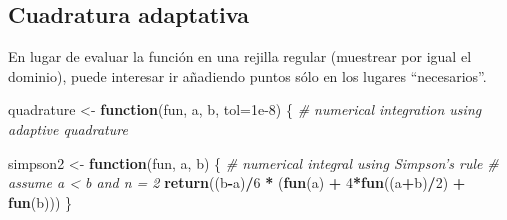 \documentclass[
]{book}
\newenvironment{Shaded}{\begin{snugshade}}{\end{snugshade}}
\newcommand{\CommentTok}[1]{\textcolor[rgb]{0.56,0.35,0.01}{\textit{#1}}}
\newcommand{\ControlFlowTok}[1]{\textcolor[rgb]{0.13,0.29,0.53}{\textbf{#1}}}
\newcommand{\DataTypeTok}[1]{\textcolor[rgb]{0.13,0.29,0.53}{#1}}
\newcommand{\DecValTok}[1]{\textcolor[rgb]{0.00,0.00,0.81}{#1}}
\newcommand{\FloatTok}[1]{\textcolor[rgb]{0.00,0.00,0.81}{#1}}
\newcommand{\KeywordTok}[1]{\textcolor[rgb]{0.13,0.29,0.53}{\textbf{#1}}}
\newcommand{\NormalTok}[1]{#1}
\newcommand{\OperatorTok}[1]{\textcolor[rgb]{0.81,0.36,0.00}{\textbf{#1}}}
\newcommand{\StringTok}[1]{\textcolor[rgb]{0.31,0.60,0.02}{#1}}
\theoremstyle{break}
\theoremstyle{definition}
\theoremstyle{definition}
\theoremstyle{definition}
\theoremstyle{remark}
\begin{document}
\hypertarget{cuadratura-adaptativa}{%
\subsection{Cuadratura adaptativa}\label{cuadratura-adaptativa}}

En lugar de evaluar la función en una rejilla regular
(muestrear por igual el dominio),
puede interesar ir añadiendo puntos sólo en los lugares ``necesarios''.

\begin{Shaded}
\begin{Highlighting}[]
\NormalTok{quadrature <-}\StringTok{ }\ControlFlowTok{function}\NormalTok{(fun, a, b, }\DataTypeTok{tol=}\FloatTok{1e-8}\NormalTok{) \{}
    \CommentTok{# numerical integration using adaptive quadrature}

\NormalTok{  simpson2 <-}\StringTok{ }\ControlFlowTok{function}\NormalTok{(fun, a, b) \{}
    \CommentTok{# numerical integral using Simpson's rule}
    \CommentTok{# assume a < b and n = 2}
    \KeywordTok{return}\NormalTok{((b}\OperatorTok{-}\NormalTok{a)}\OperatorTok{/}\DecValTok{6} \OperatorTok{*}\StringTok{ }\NormalTok{(}\KeywordTok{fun}\NormalTok{(a) }\OperatorTok{+}\StringTok{ }\DecValTok{4}\OperatorTok{*}\KeywordTok{fun}\NormalTok{((a}\OperatorTok{+}\NormalTok{b)}\OperatorTok{/}\DecValTok{2}\NormalTok{) }\OperatorTok{+}\StringTok{ }\KeywordTok{fun}\NormalTok{(b)))}
\NormalTok{  \}}
 

\end{Highlighting}
\end{Shaded}
\end{document}
